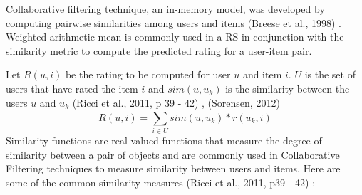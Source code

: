 \documentclass[12pt]{article}
\begin{document}
Collaborative filtering technique, an in-memory model, was developed by computing pairwise similarities among users and items (Breese et al., 1998) \cite{breese}. Weighted arithmetic mean is commonly used in a RS in conjunction with the similarity metric to compute the predicted rating for a user-item pair. 

Let  $ R(u, i) $ be the rating to be computed for user $ u $ and item $ i $. $ U $ is the set of users that have rated the item $ i $ and $sim(u, u_{k})$ is the similarity between the users $u$ and $u_{k}$ (Ricci et al., 2011, p 39 - 42) \cite{ricci}, (Sorensen, 2012) \cite{sorensen}
\begin{equation}
R(u, i) = {\sum\limits^{}_{i\in{U}} sim(u, u_{k}) * r(u_{k}, i)}
\end{equation}
Similarity functions are real valued functions that measure the degree of similarity between a pair of objects and are commonly used in Collaborative Filtering techniques to measure similarity between users and items. Here are some of the common similarity measures (Ricci et al., 2011, p39 - 42) \cite{ricci}:
\end{document}
